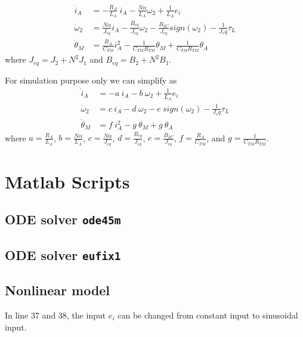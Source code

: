 \documentclass[]{article}
\begin{document}
\begin{align}
	\dot{i}_A      & = -\frac{R_A}{L_A}\ i_A - \frac{N \alpha}{L_A} \omega_2 + \frac{1}{L_A} e_{i}                         \\
	\dot{\omega}_2 & = \frac{N \alpha}{J_{eq}} i_A - \frac{B_{eq}}{J_{eq}} \omega_2 - \frac{B_{2C}}{J_{eq}} sign(\omega_2) - \frac{1}{J_eq}\tau_{L} \\
	\dot{\theta}_M & = \frac{R_A}{C_{TM}} i^2_A - \frac{1}{C_{TM} R_{TM}} \theta_M + \frac{1}{C_{TM} R_{TM}} \theta_A
\end{align}
where $J_{eq}=J_2+N^2 J_1$ and $B_{eq}=B_2+N^2 B_1$. 

For simulation purpose only we can simplify as 
\begin{align}
	\dot{i}_A      & = -a~ i_A - b~ \omega_2 + \frac{1}{L_A}e_{i}                        \\
	\dot{\omega}_2 & = c~ i_A - d~ \omega_2 - e~ sign(\omega_2) - \frac{1}{J_eq}\tau_{L} \\
	\dot{\theta}_M & = f~ i^2_A - g~ \theta_M + g~ \theta_A
\end{align}
where $a=\frac{R_A}{L_A}$, $b=\frac{N \alpha}{L_A}$, $c=\frac{N \alpha}{J_{eq}}$, $d=\frac{B_{eq}}{J_{eq}}$, $e=\frac{B_{2C}}{J_{eq}}$, $f=\frac{R_A}{C_{TM}}$, and $g=\frac{1}{C_{TM} R_{TM}}$.



\section{Matlab Scripts}

\subsection{ODE solver \texttt{ode45m}}


\subsection{ODE solver \texttt{eufix1}}


\subsection{Nonlinear model}
In line 37 and 38, the input $e_i$ can be changed from constant input to sinusoidal input.

\end{document}
